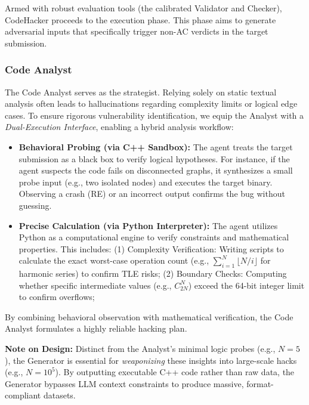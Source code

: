 \documentclass[11pt]{article}
\begin{document}
Armed with robust evaluation tools (the calibrated Validator and Checker), CodeHacker proceeds to the execution phase. This phase aims to generate adversarial inputs that specifically trigger non-AC verdicts in the target submission.

\subsubsection{Code Analyst}
\label{sec:code_analyst}

The Code Analyst serves as the strategist. Relying solely on static textual analysis often leads to hallucinations regarding complexity limits or logical edge cases. 
To ensure rigorous vulnerability identification, we equip the Analyst with a \textit{Dual-Execution Interface}, enabling a hybrid analysis workflow:

\begin{itemize}
    \item \textbf{Behavioral Probing (via C++ Sandbox):} 
    The agent treats the target submission as a black box to verify logical hypotheses. 
    For instance, if the agent suspects the code fails on disconnected graphs, it synthesizes a small probe input (e.g., two isolated nodes) and executes the target binary. 
    Observing a crash (RE) or an incorrect output confirms the bug without guessing.
    \vspace{-0.3cm}
    \item \textbf{Precise Calculation (via Python Interpreter):} 
    The agent utilizes Python as a computational engine to verify constraints and mathematical properties. 
    This includes:
    (1) Complexity Verification: Writing scripts to calculate the exact worst-case operation count (e.g., $\sum_{i=1}^{N} \lfloor N/i \rfloor$ for harmonic series) to confirm TLE risks;
    (2) Boundary Checks: Computing whether specific intermediate values (e.g., $C_{2N}^{N}$) exceed the 64-bit integer limit to confirm overflows;
\end{itemize}

By combining behavioral observation with mathematical verification, the Code Analyst formulates a highly reliable hacking plan.

\textbf{Note on Design:} Distinct from the Analyst's minimal logic probes (e.g., $N=5$), the Generator is essential for \textit{weaponizing} these insights into large-scale hacks (e.g., $N=10^5$). By outputting executable C++ code rather than raw data, the Generator bypasses LLM context constraints to produce massive, format-compliant datasets.
\end{document}
